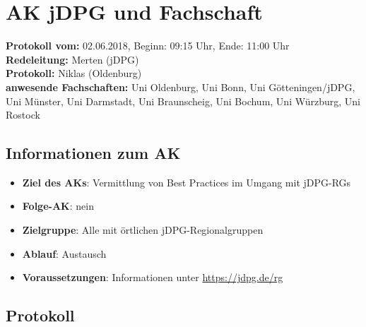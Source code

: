 
\section{AK jDPG und Fachschaft}

  \textbf{Protokoll vom:} 02.06.2018,
  Beginn: 09:15 Uhr,
  Ende: 11:00 Uhr \\
  \textbf{Redeleitung:} Merten (jDPG)\\
  \textbf{Protokoll:} Niklas (Oldenburg) \\
  \textbf{anwesende Fachschaften:} Uni Oldenburg, Uni Bonn, Uni Götteningen/jDPG, Uni Münster, Uni Darmstadt, Uni Braunscheig, Uni Bochum, Uni Würzburg, Uni Rostock

  \subsection*{Informationen zum AK}
    \begin{itemize}
      \item \textbf{Ziel des AKs}: Vermittlung von Best Practices im Umgang mit jDPG-RGs
      \item \textbf{Folge-AK}: nein
      \item \textbf{Zielgruppe}: Alle mit örtlichen jDPG-Regionalgruppen
      \item \textbf{Ablauf}: Austausch
      \item \textbf{Voraussetzungen}: Informationen unter \url{https://jdpg.de/rg}
    \end{itemize}

  \subsection*{Protokoll}
